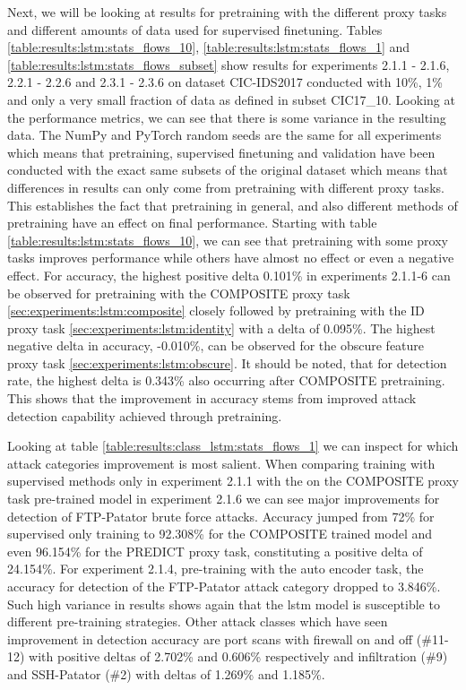 

Next, we will be looking at results for pretraining with the different proxy tasks and different amounts of data used for supervised finetuning. Tables \ref{table:results:lstm:stats_flows_10}, \ref{table:results:lstm:stats_flows_1} and \ref{table:results:lstm:stats_flows_subset} show results for experiments 2.1.1 - 2.1.6, 2.2.1 - 2.2.6 and 2.3.1 - 2.3.6 on dataset CIC-IDS2017 conducted with 10\%, 1\% and only a very small fraction of data as defined in subset CIC17\_10. Looking at the performance metrics, we can see that there is some variance in the resulting data. The NumPy and PyTorch random seeds are the same for all experiments which means that pretraining, supervised finetuning and validation have been conducted with the exact same subsets of the original dataset which means that differences in results can only come from pretraining with different proxy tasks. This establishes the fact that pretraining in general, and also different methods of pretraining have an effect on final performance. Starting with table \ref{table:results:lstm:stats_flows_10}, we can see that pretraining with some proxy tasks improves performance while others have almost no effect or even a negative effect.  
For accuracy, the highest positive delta 0.101\% in experiments 2.1.1-6 can be observed for pretraining with the COMPOSITE proxy task \ref{sec:experiments:lstm:composite} closely followed by pretraining with the ID proxy task \ref{sec:experiments:lstm:identity} with a delta of 0.095\%. The highest negative delta in accuracy, -0.010\%, can be observed for the obscure feature proxy task \ref{sec:experiments:lstm:obscure}. It should be noted, that for detection rate, the highest delta is 0.343\% also occurring after COMPOSITE pretraining. This shows that the improvement in accuracy stems from improved attack detection capability achieved through pretraining. \par
Looking at table \ref{table:results:class_lstm:stats_flows_1} we can inspect for which attack categories improvement is most salient. When comparing training with supervised methods only in experiment 2.1.1 with the on the COMPOSITE proxy task pre-trained model in experiment 2.1.6 we can see major improvements for detection of FTP-Patator brute force attacks. Accuracy jumped from 72\% for supervised only training to 92.308\% for the COMPOSITE trained model and even 96.154\% for the PREDICT proxy task, constituting a positive delta of 24.154\%. For experiment 2.1.4, pre-training with the auto encoder task, the accuracy for detection of the FTP-Patator attack category dropped to 3.846\%. Such high variance in results shows again that the \gls{lstm} model is susceptible to different pre-training strategies. Other attack classes which have seen improvement in detection accuracy are port scans with firewall on and off (\#11-12) with positive deltas of 2.702\% and 0.606\% respectively and infiltration (\#9) and SSH-Patator (\#2) with deltas of 1.269\% and 1.185\%. \par
